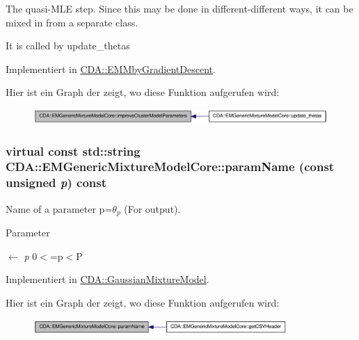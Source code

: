 The quasi-\/MLE step. Since this may be done in different-\/different ways, it can be mixed in from a separate class. 

It is called by update\_\-thetas 

Implementiert in \hyperlink{classCDA_1_1EMMbyGradientDescent_ae948fd6ba3080c1f484b3fb5a262f587}{CDA::EMMbyGradientDescent}.



Hier ist ein Graph der zeigt, wo diese Funktion aufgerufen wird:\nopagebreak
\begin{figure}[H]
\begin{center}
\leavevmode
\includegraphics[width=317pt]{classCDA_1_1EMGenericMixtureModelCore_a5a7545c679b386086bf3776315e26435_icgraph}
\end{center}
\end{figure}


\hypertarget{classCDA_1_1EMGenericMixtureModelCore_a1200a3cfc4c19ddff0c6a7eb1f5d5b2f}{
\subsubsection[{paramName}]{\setlength{\rightskip}{0pt plus 5cm}virtual const std::string CDA::EMGenericMixtureModelCore::paramName (const unsigned {\em p}) const}}
\label{classCDA_1_1EMGenericMixtureModelCore_a1200a3cfc4c19ddff0c6a7eb1f5d5b2f}


Name of a parameter p=$\theta_p$ (For output). 


\begin{DoxyParams}{Parameter}
\item[\mbox{$\leftarrow$} {\em p}]0$<$=p$<$P \end{DoxyParams}


Implementiert in \hyperlink{classCDA_1_1GaussianMixtureModel_ace9d6f0ae0c45734c78be74b2c15d36b}{CDA::GaussianMixtureModel}.



Hier ist ein Graph der zeigt, wo diese Funktion aufgerufen wird:\nopagebreak
\begin{figure}[H]
\begin{center}
\leavevmode
\includegraphics[width=274pt]{classCDA_1_1EMGenericMixtureModelCore_a1200a3cfc4c19ddff0c6a7eb1f5d5b2f_icgraph}
\end{center}
\end{figure}


